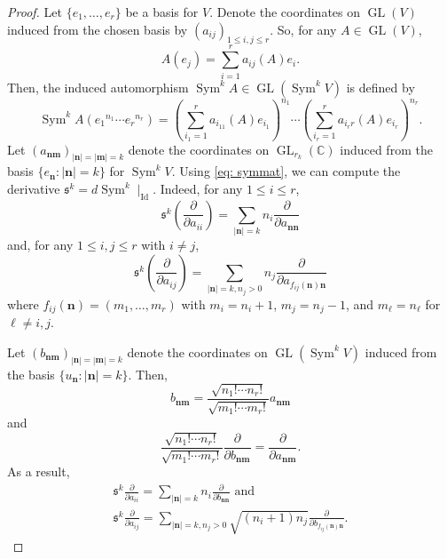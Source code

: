 \documentclass{amsart}
\theoremstyle{definition}
\theoremstyle{remark}
\numberwithin{equation}{section}
\newcommand{\tanv}[1]{\frac{\partial}{\partial #1}}
\DeclareMathOperator{\Sym}{Sym}
\DeclareMathOperator{\Id}{Id}
\DeclareMathOperator{\GL}{GL}
\begin{document}
\begin{proof}



Let $\{e_1, \dotsc, e_r\}$ be a basis for $V$. Denote the coordinates on $\GL(V)$ induced from the chosen basis by $(a_{ij})_{1 \leq i,j \leq r}$. So, for any $A \in \GL(V)$,
$$
A(e_j) = \sum_{i=1}^r a_{ij}(A) e_i.
$$
Then, the induced automorphism $\Sym^k A \in \GL(\Sym^k V)$ is defined by
\begin{equation} \label{eq: symmat}
\Sym^k A({e_1}^{n_1} \dotsb {e_r}^{n_r}) = \left ( \sum_{i_1 =1}^r a_{i_11}(A) e_{i_1} \right )^{n_1} \dotsb \left ( \sum_{i_r =1}^r a_{i_rr}(A) e_{i_r} \right )^{n_r}.
\end{equation}
Let $(a_{\mathbf{n}\mathbf{m}})_{|\mathbf{n}|=|\mathbf{m}| = k}$ denote the coordinates on $\GL_{r_k}(\mathbb{C})$ induced from the basis $\{e_{\mathbf{n}} : |\mathbf{n}| = k\}$ for $\Sym^k V$. Using \eqref{eq: symmat}, we can compute the derivative $\mathfrak{s}^k = d \Sym^k \mid_{\Id}$. Indeed, for any $1 \leq i \leq r$,
$$
\mathfrak{s}^k \left ( \tanv{a_{ii}} \right ) = \sum_{|\mathbf{n}| = k} n_i \tanv{a_{\mathbf{n}\mathbf{n}}}
$$
and, for any $1 \leq i,j \leq r$ with $i \neq j$,
$$
\mathfrak{s}^k \left ( \tanv{a_{ij}} \right ) = \sum_{|\mathbf{n}| = k, n_j >0 } n_j \tanv{a_{f_{ij}(\mathbf{n})\mathbf{n}}}
$$
where $f_{ij}(\mathbf{n}) = (m_1, \dotsc, m_r)$ with $m_i = n_i+1$, $m_j = n_j-1$, and $m_\ell = n_\ell$ for $\ell \neq i,j$.

Let $(b_{\mathbf{n}\mathbf{m}})_{|\mathbf{n}|=|\mathbf{m}| = k}$ denote the coordinates on $\GL(\Sym^k V)$ induced from the basis $\{u_{\mathbf{n}} : |\mathbf{n}|=k\}$. Then, 
$$
b_{\mathbf{n}\mathbf{m}} = \frac{\sqrt{n_1! \dotsb n_r!}}{\sqrt{m_1! \dotsb m_r!}} a_{\mathbf{n}\mathbf{m}}
$$
and
$$
 \frac{\sqrt{n_1! \dotsb n_r!}}{\sqrt{m_1! \dotsb m_r!}} \tanv{b_{\textbf{n}\textbf{m}}} = \tanv{a_{\textbf{n}\textbf{m}}}.
$$
As a result,
\begin{gather*}
\mathfrak{s}^k \tanv{a_{ii}} = \sum_{|\mathbf{n}| = k} n_i \tanv{b_{\mathbf{n}\mathbf{n}}} \text{ and }  \\
\mathfrak{s}^k \tanv{a_{ij}} = \sum_{|\mathbf{n}| = k, n_j > 0} \sqrt{(n_i + 1)n_j} \tanv{b_{f_{ij}(\mathbf{n})\mathbf{n}}}.
\end{gather*}



\end{proof}
\end{document}
